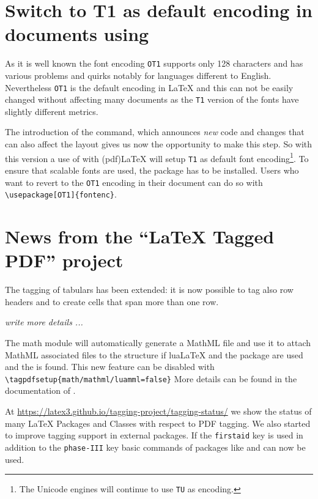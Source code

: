 \documentclass{ltnews}
\begin{document}
\section{Switch to T1 as default encoding in documents using }

As it is well known the font encoding \texttt{OT1} supports only 128
characters and has various problems and quirks notably for languages
different to English.  Nevertheless \texttt{OT1} is the default
encoding in \LaTeX{} and this can not be easily changed without
affecting many documents as the \texttt{T1} version of the fonts have
slightly different metrics.

The introduction of the  command, which announces
\emph{new} code and changes that can also affect the layout gives us
now the opportunity to make this step. So with this version a use of
 with (pdf)\LaTeX{} will setup \texttt{T1} as
default font encoding\footnote{The Unicode engines will continue to
use \texttt{TU} as encoding.}. To ensure that scalable fonts are used,
the package  has to be installed. Users who want to
revert to the \texttt{OT1} encoding in their document can do so with
\verb+\usepackage[OT1]{fontenc}+.



\section{News from the \enquote{\LaTeX{} Tagged PDF} project}

The tagging of tabulars has been extended: it is now possible to tag
also row headers and to create cells that span more than one row.

\emph{write more details ...}


The math module will automatically generate a MathML file and use it
to attach MathML associated files to the structure if lua\LaTeX{} and
the  package are used and the  is found.
This new feature can be disabled with
\verb+\tagpdfsetup{math/mathml/luamml=false}+ More details can be
found in the documentation of .

At \url{https://latex3.github.io/tagging-project/tagging-status/} we
show the status of many \LaTeX{} Packages and Classes with respect to
PDF tagging.  We also started to improve tagging support in external
packages. If the \texttt{firstaid} key is used in addition to the
\texttt{phase-III} key basic commands of packages like 
and  can now be used.
\end{document}
